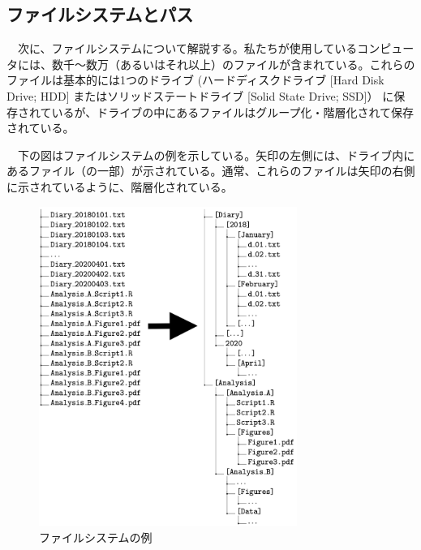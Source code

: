 \documentclass[
  a4paper,
  pandoc,
  ja=standard,
  jafont=haranoaji]{bxjsbook}
\begin{document}
\hypertarget{ux30d5ux30a1ux30a4ux30ebux30b7ux30b9ux30c6ux30e0ux3068ux30d1ux30b9}{%
\subsection{ファイルシステムとパス}\label{ux30d5ux30a1ux30a4ux30ebux30b7ux30b9ux30c6ux30e0ux3068ux30d1ux30b9}}

　次に、ファイルシステムについて解説する。私たちが使用しているコンピュータには、数千〜数万（あるいはそれ以上）のファイルが含まれている。これらのファイルは基本的には1つのドライブ
(ハードディスクドライブ {[}Hard Disk Drive; HDD{]}
またはソリッドステートドライブ {[}Solid State Drive; SSD{]}）
に保存されているが、ドライブの中にあるファイルはグループ化・階層化されて保存されている。

　下の図はファイルシステムの例を示している。矢印の左側には、ドライブ内にあるファイル（の一部）が示されている。通常、これらのファイルは矢印の右側に示されているように、階層化されている。

\begin{figure}

{\centering \includegraphics[width=0.75\textwidth,height=\textheight]{./Figs/Rbasic/Filesystem1.png}

}

\caption{\label{fig-rbasic_filesystem}ファイルシステムの例}

\end{figure}
\end{document}
